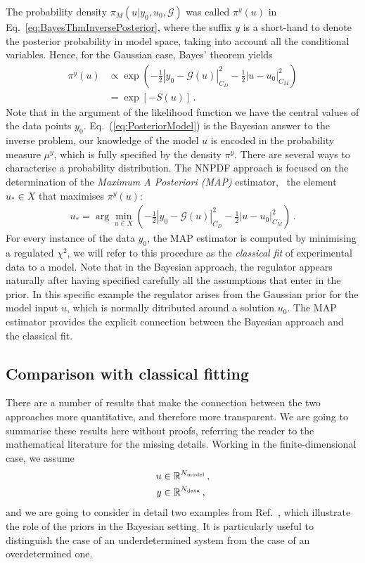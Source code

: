 The probability density $\pi_M(u|y_0,u_0,\mathcal{G})$ was called $\pi^y(u)$ in
Eq.~\ref{eq:BayesThmInversePosterior}, where the suffix $y$ is a short-hand to
denote the posterior probability in model space, taking into account all the
conditional variables. Hence, for the Gaussian case, Bayes' theorem yields
\begin{align}
  \label{eq:PosteriorModel}
  \pi^y(u) &\propto 
  \exp\left(
  -\frac12 \left| y_0 - \mathcal G(u) \right|_{C_D}^2
  -\frac12 \left| u - u_0 \right|_{C_M}^2
  \right)\\ 
  &= \exp\left[
    - S(u)
  \right]\, .
\end{align}
Note that in the argument of the likelihood function we have the central values
of the data points $y_0$. Eq.~(\ref{eq:PosteriorModel}) is the Bayesian answer
to the inverse problem, our knowledge of the model $u$ is encoded in the
probability measure $\mu^y$, which is fully specified by the density $\pi^y$.
There are several ways to characterise a probability distribution. The NNPDF
approach is focused on the determination of the {\em Maximum A Posteriori (MAP)}
estimator, \ie\ the element $u_* \in X$ that maximises $\pi^y(u)$:
\begin{align}\label{eq:MAP}
  u_* = \arg\min_{u \in X} 
  \left(
  -\frac12 \left| y_0 - \mathcal G(u) \right|_{C_D}^2
  -\frac12 \left| u - u_0 \right|_{C_M}^2
  \right)\, .
\end{align}
For every instance of the data $y_0$, the MAP estimator is computed by
minimising a regulated $\chi^2$, we will refer to this procedure as the {\em
classical fit} of experimental data to a model. Note that in the Bayesian
approach, the regulator appears naturally after having specified carefully all
the assumptions that enter in the prior. In this specific example the regulator
arises from the Gaussian prior for the model input $u$, which is normally
ditributed around a solution $u_0$. The MAP estimator provides the explicit
connection between the Bayesian approach and the classical fit.

\subsection{Comparison with classical fitting}
\label{sec:comp-class-fit}

There are a number of results that make the connection between the two
approaches more quantitative, and therefore more transparent. We are
going to summarise these results here without proofs, referring the
reader to the mathematical literature for the missing details. Working
in the finite-dimensional case, we assume 
\begin{align*}
  u &\in \mathbb{R}^{N_{\rm model}} \, ,\\
  y &\in \mathbb{R}^{N_{\rm data}}\, ,
\end{align*}
and we are going to consider in detail two examples from Ref.~\cite{StuartCore},
which illustrate the role of the priors in the Bayesian setting. It is
particularly useful to distinguish the case of an underdetermined system from
the case of an overdetermined one. 

